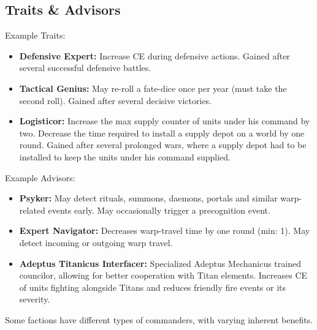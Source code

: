  \subsection{Traits \& Advisors}
 Example Traits:
 \begin{itemize}
     \item \textbf{Defensive Expert:} Increase CE during defensive actions. Gained after several successful defensive battles.
     \item \textbf{Tactical Genius:} May re-roll a fate-dice once per year (must take the second roll). Gained after several decisive victories.
     \item \textbf{Logisticor:} Increase the max supply counter of units under his command by two. Decrease the time required to install a supply depot on a world by one round. Gained after several prolonged wars, where a supply depot had to be installed to keep the units under his command supplied.
 \end{itemize}
 Example Advisors:
 \begin{itemize}
     \item \textbf{Psyker:} May detect rituals, summons, daemons, portals and similar warp-related events early. May occasionally trigger a precognition event.
     \item \textbf{Expert Navigator:} Decreases warp-travel time by one round (min: 1). May detect incoming or outgoing warp travel.
     \item \textbf{Adeptus Titanicus Interfacer:} Specialized Adeptus Mechanicus trained councilor, allowing for better cooperation with Titan elements. Increases CE of units fighting alongside Titans and reduces friendly fire events or its severity.
 \end{itemize}
Some factions have different types of commanders, with varying inherent benefits.